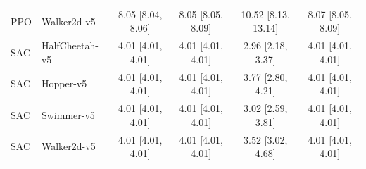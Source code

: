 \begin{table}[!t]
\begin{tabular}{@{}llcccc@{}}
PPO & Walker2d-v5 & 8.05 [8.04, 8.06] & 8.05 [8.05, 8.09] & 10.52 [8.13, 13.14] & 8.07 [8.05, 8.09] \\
SAC & HalfCheetah-v5 & 4.01 [4.01, 4.01] & 4.01 [4.01, 4.01] & 2.96 [2.18, 3.37] & 4.01 [4.01, 4.01] \\
SAC & Hopper-v5 & 4.01 [4.01, 4.01] & 4.01 [4.01, 4.01] & 3.77 [2.80, 4.21] & 4.01 [4.01, 4.01] \\
SAC & Swimmer-v5 & 4.01 [4.01, 4.01] & 4.01 [4.01, 4.01] & 3.02 [2.59, 3.81] & 4.01 [4.01, 4.01] \\
SAC & Walker2d-v5 & 4.01 [4.01, 4.01] & 4.01 [4.01, 4.01] & 3.52 [3.02, 4.68] & 4.01 [4.01, 4.01] \\
\bottomrule
\end{tabular}
\end{table}
